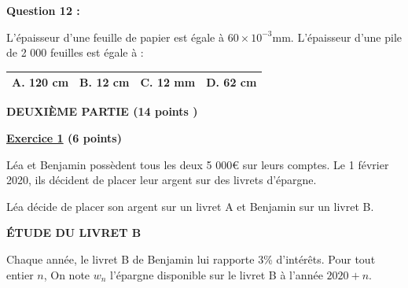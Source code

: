 \documentclass[12pt,a4paper]{exam}
\begin{document}
\vspace{10pt}

\textbf{Question 12 :}
\vspace{5pt}

L’épaisseur d’une feuille de papier est égale à $60 \times 10^{-3}$mm.
L’épaisseur d’une pile de 2 000 feuilles est égale à :

\begin{center}
    \renewcommand{\arraystretch}{3}
    \begin{tabular}{|m{3.4cm}|m{3.4cm}|m{3.9cm}|m{3.4cm}|}
    \hline
    \centering \vspace{-0.3cm} \textbf{A.} 120 cm & 
    \centering \vspace{-0.3cm} \textbf{B.} 12 cm & 
    \centering \vspace{-0.3cm} \textbf{C.} 12 mm & 
    \centering \vspace{-0.3cm} \textbf{D.} 62 cm \tabularnewline
    \hline
    \end{tabular}
\end{center}

\vspace{10pt}








\begin{center}
    \textbf{DEUXIÈME PARTIE (14 points )}
\end{center}

\textbf{\underline{Exercice 1} (6 points)}

\vspace{10pt}
Léa et Benjamin possèdent tous les deux 5 000€ sur leurs comptes. Le 1 février 2020, ils décident de 
placer leur argent sur des livrets d'épargne. 

\vspace{5pt}
Léa décide de placer son argent sur un livret A et Benjamin sur un livret B.

\vspace{10pt}

\textbf{ÉTUDE DU LIVRET B}

\vspace{5pt}
Chaque année, le livret B de Benjamin lui rapporte 3\% d'intérêts. Pour tout entier $n$, On note $w_n$ l'épargne disponible 
sur le livret B à l'année $2020 + n$.
\end{document}
